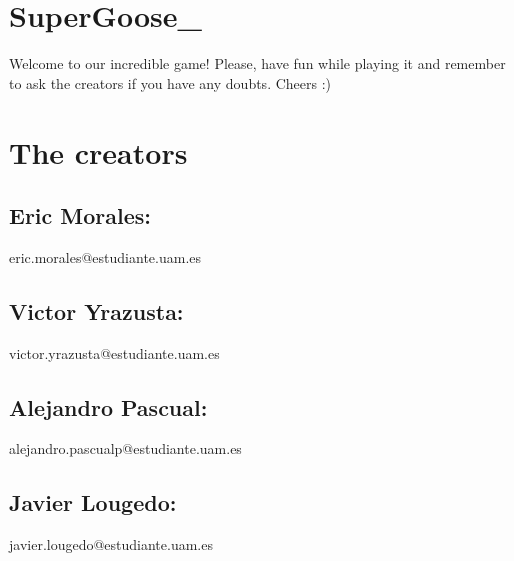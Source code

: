\hypertarget{index_intro_sec}{}\section{Super\+Goose\+\_}\label{index_intro_sec}
Welcome to our incredible game! Please, have fun while playing it and remember to ask the creators if you have any doubts. Cheers \+:)\hypertarget{index_install_sec}{}\section{The creators}\label{index_install_sec}
\hypertarget{index_step1}{}\subsection{Eric Morales\+:}\label{index_step1}
\begin{DoxyVerb}eric.morales@estudiante.uam.es
\end{DoxyVerb}
\hypertarget{index_step2}{}\subsection{Victor Yrazusta\+:}\label{index_step2}
\begin{DoxyVerb}victor.yrazusta@estudiante.uam.es
\end{DoxyVerb}
\hypertarget{index_step3}{}\subsection{Alejandro Pascual\+:}\label{index_step3}
\begin{DoxyVerb}alejandro.pascualp@estudiante.uam.es
\end{DoxyVerb}
\hypertarget{index_step4}{}\subsection{Javier Lougedo\+:}\label{index_step4}
\begin{DoxyVerb}javier.lougedo@estudiante.uam.es\end{DoxyVerb}
 